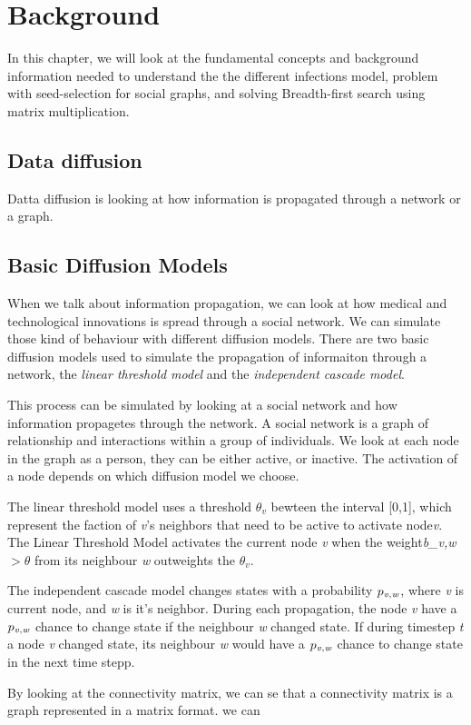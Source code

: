 \chapter{Background} 

In this chapter, we will look at the fundamental concepts and background information needed to understand the the different infections model, problem with seed-selection for social graphs, and solving Breadth-first search using matrix multiplication.

\section{Data diffusion}
Datta diffusion is looking at how information is propagated through a network or a graph. 

\section{Basic Diffusion Models}
When we talk about information propagation, we can look at how medical and technological innovations is spread through a social network. We can simulate those kind of behaviour with different diffusion models. There are two basic diffusion models used to simulate the propagation of informaiton through a network\cite{kempe}, the {\it linear threshold model} and the {\it independent cascade model}\cite{kempe}.

This process can be simulated by looking at a social network and how information propagetes through the network. A social network is a graph of relationship and interactions within a group of individuals. 
We look at each node in the graph as a person, they can be either active, or inactive. The activation of a node depends on which diffusion model we choose.

The linear threshold model uses a threshold $\theta_v$ bewteen the interval [0,1], which represent the faction of {\it v}'s neighbors that need to be active to activate node{\it v}. The Linear Threshold Model activates the current node {\it v} when the weight{\it b_{v,w}} $> \theta$ from its neighbour {\it w} outweights the $\theta_v$. 

The independent cascade model changes states with a probability $p_{\it v, w}$, where {\it v }is current node, and {\it w} is it's neighbor. During each propagation, the node {\it v} have a  $p_{\it v, w}$ chance to change state if the neighbour {\it w} changed state. If during timestep {\it t} a node {\it v} changed state, its neighbour {\it w} would have a  $p_{\it v, w}$ chance to change state in the next time stepp. 

By looking at the 	connectivity matrix, we can se that a connectivity matrix is a graph represented in a matrix format. we can